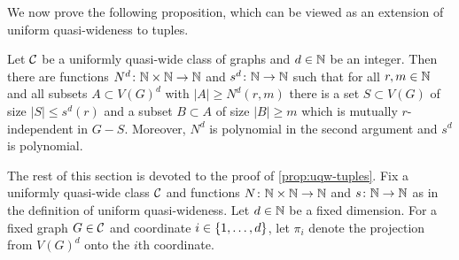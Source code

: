 We now prove the following proposition, which can be viewed as an extension of uniform quasi-wideness to tuples.

\begin{proposition}\label{prop:uqw-tuples}
	Let $\cal C$ be a uniformly quasi-wide class of graphs and $d\in\N$ be an integer.
	Then there are functions $N^d\colon \N\times\N\to\N$ and $s^d\colon \N\to\N$
	such that for all $r,m\in\N$ and all subsets $A\subset V(G)^d$
	with $|A|\ge N^d(r,m)$ there  is a set $S\subset V(G)$
	of size $|S|\le s^d(r)$ and a subset $B\subset A$ of size $|B|\ge m$ which is mutually $r$-independent in $G-S$. Moreover, $N^d$ is polynomial in the second argument and $s^d$ is polynomial. 
\end{proposition}

The rest of this section is devoted to the proof of \cref{prop:uqw-tuples}.
Fix a uniformly quasi-wide class $\cal C$ and functions $N\colon \N\times\N\to \N$
	and $s\colon \N\to\N$ as in the definition of uniform quasi-wideness.
	Let $d\in \N$ be a fixed dimension.
		For a fixed graph $G\in \cal C$  and
	  coordinate $i\in\set{1,\ldots,d}$, let $\pi_i$ denote the projection from $V(G)^d$ onto the $i$th coordinate.

	


